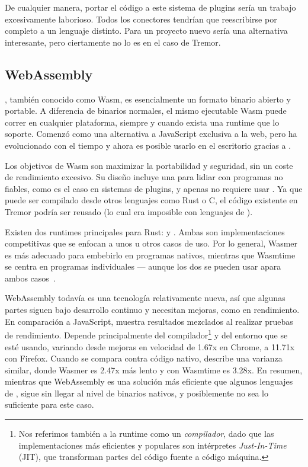 De cualquier manera, portar el código a este sistema de plugins sería un trabajo
excesivamente laborioso. Todos los conectores tendrían que reescribirse por
completo a un lenguaje distinto. Para un proyecto nuevo sería una alternativa
interesante, pero ciertamente no lo es en el caso de Tremor.

\subsection{WebAssembly}

\textcite{wasm}, también conocido como Wasm, es esencialmente un formato binario
abierto y portable. A diferencia de binarios normales, el mismo ejecutable Wasm
puede correr en cualquier plataforma, siempre y cuando exista una runtime que lo
soporte. Comenzó como una alternativa a JavaScript exclusiva a la web, pero ha
evolucionado con el tiempo y ahora es posible usarlo en el escritorio gracias a
\textcite{wasi}.

Los objetivos de Wasm son maximizar la portabilidad y seguridad, sin un coste de
rendimiento excesivo. Su diseño incluye una \sandbox para lidiar con programas
no fiables, como es el caso en sistemas de plugins, y apenas no requiere usar
\unsafe. Ya que puede ser compilado desde otros lenguajes como Rust o C, el
código existente en Tremor podría ser reusado (lo cual era imposible con
lenguajes de \scripting).

Existen dos runtimes principales para Rust: \textcite{wasmer} y
\textcite{wasmtime}. Ambas son implementaciones competitivas que se enfocan a
unos u otros casos de uso. Por lo general, Wasmer es más adecuado para embebirlo
en programas nativos, mientras que Wasmtime se centra en programas individuales
--- aunque los dos se pueden usar apara ambos casos~\cite{wasmwikiusage}.

WebAssembly todavía es una tecnología relativamente nueva, así que algunas
partes siguen bajo desarrollo continuo y necesitan mejoras, como en rendimiento.
En comparación a JavaScript, \textcite{jangda2019not} muestra resultados
mezclados al realizar pruebas de rendimiento. Depende principalmente del
compilador\footnote{Nos referimos también a la runtime como un
\emph{compilador}, dado que las implementaciones más eficientes y populares son
intérpretes \emph{Just-In-Time} (JIT), que transforman partes del código fuente
a código máquina.} y del entorno que se esté usando, variando desde mejoras en
velocidad de 1.67x en Chrome, a 11.71x con Firefox. Cuando se compara contra
código nativo, \textcite{libsodiumwasmperf} describe una varianza similar, donde
Wasmer es 2.47x más lento y con Wasmtime es 3.28x. En resumen, mientras que
WebAssembly es una solución más eficiente que algunos lenguajes de \scripting,
sigue sin llegar al nivel de binarios nativos, y posiblemente no sea lo
suficiente para este caso.

